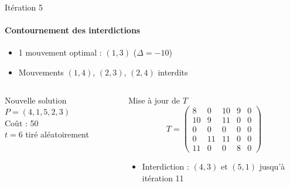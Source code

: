 \documentclass{beamer}
\begin{document}
\begin{frame}{Itération 5}
    \framesubtitle{Contournement des interdictions}


    \begin{itemize}
        \item 1 mouvement optimal : \( (1,3) \) (\( \Delta = -10 \))
        \item Mouvements \( (1,4) \), \( (2,3) \), \( (2,4) \) interdits
    \end{itemize}

    \begin{columns}
        \begin{alertblock}{Nouvelle solution}
            \( P = (4, 1, 5, 2, 3) \) \\
            Coût : 50 \\
            \( t = 6 \) tiré aléatoirement
        \end{alertblock}

        \begin{exampleblock}{Mise à jour de \( T \)}
            \[
                T = \begin{pmatrix}
                    8  & 0  & 10 & 9 & 0 \\
                    10 & 9  & 11 & 0 & 0 \\
                    0  & 0  & 0  & 0 & 0 \\
                    0  & 11 & 11 & 0 & 0 \\
                    11 & 0  & 0  & 8 & 0
                \end{pmatrix}
            \]
            \begin{itemize}
                \item Interdiction : \( (4,3) \) et \( (5,1) \) jusqu'à itération 11
            \end{itemize}
        \end{exampleblock}
    \end{columns}
\end{frame}
\end{document}
